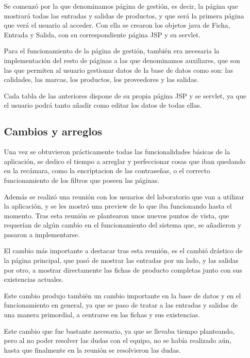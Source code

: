 Se comenzó por la que denominamos página de gestión, es decir, la página que mostrará todas las entradas y salidas de productos, y que será la primera página que verá el usuario al acceder. Con ella se crearon los objetos java de Ficha, Entrada y Salida, con su correspondiente página JSP y su servlet.

Para el funcionamiento de la página de gestión, también era necesaria la implementación del resto de páginas a las que denominamos auxiliares, que son las que permiten al usuario gestionar datos de la base de datos como son: las calidades, las marcas, los productos, los proveedores y las salidas.

Cada tabla de las anteriores dispone de su propia página JSP y se servlet, ya que el usuario podrá tanto añadir como editar los datos de todas ellas.


\subsection{Cambios y arreglos}

Una vez se obtuvieron prácticamente todas las funcionalidades básicas de la aplicación, se dedico el tiempo a arreglar y perfeccionar cosas que iban quedando en la recámara, como la encriptacion de las contraseñas, o el correcto funcionamiento de los filtros que poseen las páginas. 

Además se realizó una reunión con los usuarios del laboratorio que van a utilizar la aplicación, y se les mostró una preview de lo que iba funcionando hasta el momento. Tras esta reunión se plantearon unos nuevos puntos de vista, que requerían de algún cambio en el funcionamiento del sistema que, se añadieron y pasaron a implementarse.

El cambio más importante a destacar tras esta reunión, es el cambió drástico de la página principal, que pasó de mostrar las entradas por un lado, y las salidas por otro, a mostrar directamente las fichas de producto completas junto con sus existencias actuales.

Este cambio produjo también un cambio importante en la base de datos y en el funcionamiento en general, ya que se paso de tratar a las entradas y salidas de una manera primordial, a centrarse en las fichas y sus existencias. 

Este cambio que fue bastante necesario, ya que se llevaba tiempo planteando, pero al no poder resolver las dudas con el equipo, no se había realizado aún, hasta que finalmente en la reunión se resolvieron las dudas.


